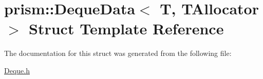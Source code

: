 \hypertarget{structprism_1_1_deque_data}{}\section{prism\+:\+:Deque\+Data$<$ T, T\+Allocator $>$ Struct Template Reference}
\label{structprism_1_1_deque_data}


The documentation for this struct was generated from the following file\+:\begin{DoxyCompactItemize}
\item 
\hyperlink{_deque_8h}{Deque.\+h}\end{DoxyCompactItemize}
